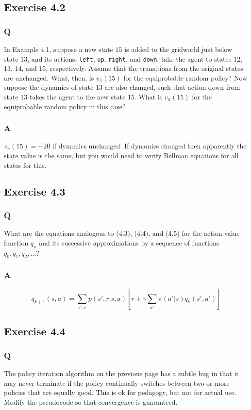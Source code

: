 \subsection{Exercise 4.2}
\subsubsection{Q}
In Example 4.1, suppose a new state $15$ is added to the gridworld just below state $13$, and its actions, \texttt{left}, \texttt{up}, \texttt{right}, and \texttt{down}, take the agent to states $12$, $13$, $14$, and $15$, respectively. Assume that the transitions from the original states are unchanged. What, then, is $v_\pi(15)$ for the equiprobable random policy? Now suppose the dynamics of state $13$ are also changed, such that action down from state $13$ takes the agent to the new state $15$. What is $v_\pi(15)$ for the equiprobable random policy in this case?

\subsubsection{A}
$v_\pi(15) = -20$ if dynamics unchanged. If dynamics changed then apparently the state value is the same, but you would need to verify Bellman equations for all states for this.

\subsection{Exercise 4.3}
\subsubsection{Q}
What are the equations analogous to (4.3), (4.4), and (4.5) for the action-value function $q_\pi$ and its successive approximations by a sequence of functions $q_0, q_1, q_2, \dots$?

\subsubsection{A}
\begin{equation}
    q_{k+1}(s, a) = \sum_{s', r} p(s', r | s, a)\left[r + \gamma \sum_{a'} \pi(a'|s)q_k(s', a')\right]
\end{equation}

\subsection{Exercise 4.4}
\subsubsection{Q}
The policy iteration algorithm on the previous page has a subtle bug in that it may never terminate if the policy continually switches between two or more policies that are equally good. This is ok for pedagogy, but not for actual use. Modify the pseudocode so that convergence is guaranteed.

